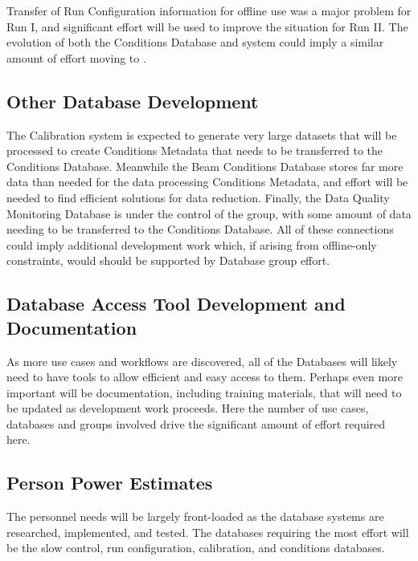 \documentclass[../main-v1.tex]{subfiles}
\begin{document}
Transfer of Run Configuration information for offline use was a major problem for  Run I, and significant effort will be used to improve the situation for Run II.  The evolution of both the  Conditions Database and  system could imply a similar amount of effort moving to .


\subsection{Other Database Development}

The  Calibration system is expected to generate very large datasets that will be processed to create Conditions Metadata that needs to be transferred to the Conditions Database.  Meanwhile the Beam Conditions Database stores far more data than needed for the data processing Conditions Metadata, and effort will be needed to find efficient solutions for data reduction.  Finally, the Data Quality Monitoring Database is under the control of the  group, with some amount of data needing to be transferred to the Conditions Database.  All of these connections could imply additional development work which, if arising from offline-only constraints, would should be supported by Database group effort.


\subsection{Database Access Tool Development and Documentation}

As more use cases and workflows are discovered, all of the  Databases will likely need to have tools to allow efficient and easy access to them. Perhaps even more important will be documentation, including training materials, that will need to be updated as development work proceeds.  Here the number of use cases, databases and groups involved drive the significant amount of effort required here.


\subsection{Person Power Estimates}

The personnel needs will be largely front-loaded as the database systems are researched, implemented, and tested. The databases requiring the most effort will be the slow control, run configuration, calibration, and conditions databases.  
\end{document}
